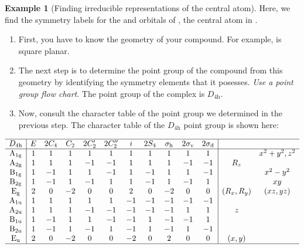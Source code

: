 \documentclass[a4paper]{tufte-handout}
\theoremstyle{definition}
\newtheorem{example}{Example}
\begin{document}
\begin{example}[Finding irreducible representations of the central atom]
  Here, we find the symmetry labels for the  and  orbitals of ,
  the central atom in .

  \begin{enumerate}
    \item First, you have to know the geometry of your compound. For example,  is square planar.
    \item The next step is to determine the point group of the compound from this geometry by identifying the symmetry elements that it posesses. \textit{Use a point group flow chart}. The point group of the  complex is $D_{4\mathrm{h}}$.
    \item Now, consult the character table of the point group we determined in the previous step.
    The character table of the $D_{4\mathrm{h}}$ point group is shown here:
  \end{enumerate}

  $$\begin{array}{c|cccccccccc|cc} \hline
  D_\mathrm{4h} & E & 2C_4 & C_2 & 2C_2' & 2C_2'' & i & 2S_4 & \sigma_\mathrm{h} & 2\sigma_\mathrm{v} & 2\sigma_\mathrm{d} & & \\ \hline
  \mathrm{A_{1g}} & 1 & 1 & 1 & 1 & 1 & 1 & 1 & 1 & 1 & 1 & & x^2+y^2,z^2 \\
  \mathrm{A_{2g}} & 1 & 1 & 1 & -1 & -1 & 1 & 1 & 1 & -1 & -1 & R_z & \\
  \mathrm{B_{1g}} & 1 & -1 & 1 & 1 & -1 & 1 & -1 & 1 & 1 & -1 & & x^2-y^2 \\
  
  \mathrm{B_{2g}} & 1 & -1 & 1 & -1 & 1 & 1 & -1 & 1 & -1 & 1 & & xy \\
  \mathrm{E_g} & 2 & 0 & -2 & 0 & 0 & 2 & 0 & -2 & 0 & 0 & (R_x,R_y) & (xz,yz) \\
  \mathrm{A_{1u}} & 1 & 1 & 1 & 1 & 1 & -1 & -1 & -1 & -1 & -1 & & \\
  \mathrm{A_{2u}} & 1 & 1 & 1 & -1 & -1 & -1 & -1 & -1 & 1 & 1 & z & \\
  \mathrm{B_{1u}} & 1 & -1 & 1 & 1 & -1 & -1 & 1 & -1 & -1 & 1 & & \\
  \mathrm{B_{2u}} & 1 & -1 & 1 & -1 & 1 & -1 & 1 & -1 & 1 & -1 & & \\
  \mathrm{E_u} & 2 & 0 & -2 & 0 & 0 & -2 & 0 & 2 & 0 & 0 & (x,y) & \\ \hline
  \end{array}$$


\end{example}
\end{document}
